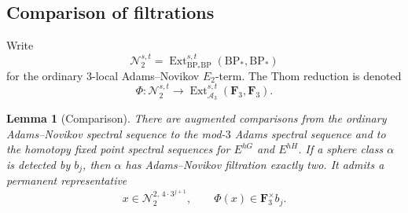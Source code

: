 \documentclass[11pt]{article}
\newtheorem{lemma}[theorem]{Lemma}
\theoremstyle{definition}
\theoremstyle{remark}
\numberwithin{equation}{section}
\begin{document}
\subsection{Comparison of filtrations}

Write
\[
 \mathcal N_2^{s,t}
 =\operatorname{Ext}_{\mathrm{BP}_*\mathrm{BP}}^{s,t}(\mathrm{BP}_*,\mathrm{BP}_*)
\]
for the ordinary \(3\)-local Adams--Novikov \(E_2\)-term.
The Thom reduction is denoted
\[
 \Phi:\mathcal N_2^{s,t}
 \longrightarrow
 \operatorname{Ext}_{\mathcal A_3}^{s,t}(\mathbf F_3,\mathbf F_3).
\]

\begin{lemma}[Comparison]\label{det:filtration-comparison}
There are augmented comparisons from the ordinary
Adams--Novikov spectral sequence to the mod-\(3\) Adams spectral
sequence and to the homotopy fixed point spectral sequences for
\(E^{hG}\) and \(E^{hH}\).
If a sphere class \(\alpha\) is detected by \(b_j\), then
\(\alpha\) has Adams--Novikov filtration exactly two.
It admits a permanent representative
\[
 x\in\mathcal N_2^{2,\,4\cdot3^{j+1}},
 \qquad \Phi(x)\in\mathbf F_3^\times b_j .
\]
\end{lemma}
\end{document}
